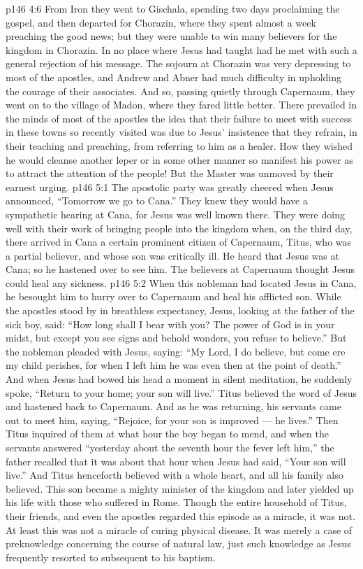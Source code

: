 \vs p146 4:6 \pc From Iron they went to Gischala, spending two days proclaiming the gospel, and then departed for Chorazin, where they spent almost a week preaching the good news; but they were unable to win many believers for the kingdom in Chorazin. In no place where Jesus had taught had he met with such a general rejection of his message. The sojourn at Chorazin was very depressing to most of the apostles, and Andrew and Abner had much difficulty in upholding the courage of their associates. And so, passing quietly through Capernaum, they went on to the village of Madon, where they fared little better. There prevailed in the minds of most of the apostles the idea that their failure to meet with success in these towns so recently visited was due to Jesus’ insistence that they refrain, in their teaching and preaching, from referring to him as a healer. How they wished he would cleanse another leper or in some other manner so manifest his power as to attract the attention of the people! But the Master was unmoved by their earnest urging.
\vs p146 5:1 The apostolic party was greatly cheered when Jesus announced, \textcolor{ubdarkred}{“Tomorrow we go to Cana.”} They knew they would have a sympathetic hearing at Cana, for Jesus was well known there. They were doing well with their work of bringing people into the kingdom when, on the third day, there arrived in Cana a certain prominent citizen of Capernaum, Titus, who was a partial believer, and whose son was critically ill. He heard that Jesus was at Cana; so he hastened over to see him. The believers at Capernaum thought Jesus could heal any sickness.
\vs p146 5:2 When this nobleman had located Jesus in Cana, he besought him to hurry over to Capernaum and heal his afflicted son. While the apostles stood by in breathless expectancy, Jesus, looking at the father of the sick boy, said: \textcolor{ubdarkred}{“How long shall I bear with you? The power of God is in your midst, but except you see signs and behold wonders, you refuse to believe.”} But the nobleman pleaded with Jesus, saying: “My Lord, I do believe, but come ere my child perishes, for when I left him he was even then at the point of death.” And when Jesus had bowed his head a moment in silent meditation, he suddenly spoke, \textcolor{ubdarkred}{“Return to your home; your son will live.”} Titus believed the word of Jesus and hastened back to Capernaum. And as he was returning, his servants came out to meet him, saying, “Rejoice, for your son is improved --- he lives.” Then Titus inquired of them at what hour the boy began to mend, and when the servants answered “yesterday about the seventh hour the fever left him,” the father recalled that it was about that hour when Jesus had said, “Your son will live.” And Titus henceforth believed with a whole heart, and all his family also believed. This son became a mighty minister of the kingdom and later yielded up his life with those who suffered in Rome. Though the entire household of Titus, their friends, and even the apostles regarded this episode as a miracle, it was not. At least this was not a miracle of curing physical disease. It was merely a case of preknowledge concerning the course of natural law, just such knowledge as Jesus frequently resorted to subsequent to his baptism.
